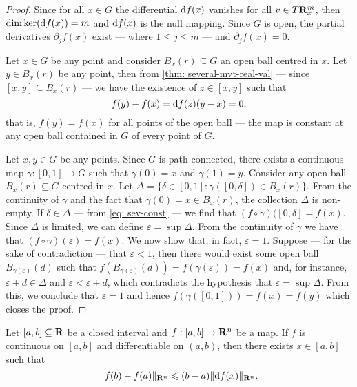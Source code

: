 \begin{proof}
  Since for all \(x \in G\) the differential \(\mathrm{d} f(x)\) vanishes for all \(v
  \in T\mathbf{R}^m_x\), then \(\dim \ker(\mathrm{d} f(x)) = m\) and \(\mathrm{d} f(x)\) is the
  null mapping. Since \(G\) is open, the partial derivatives \(\partial_j f(x)\)
  exist --- where \(1 \leq j \leq m\) --- and \(\partial_j f(x) = 0\).

  Let \(x \in G\) be any point and consider \(B_x(r) \subseteq G\) an open ball
  centred in \(x\). Let \(y \in B_x(r)\) be any point, then from \cref{thm:
  several-mvt-real-val} --- since \([x, y] \subseteq B_x(r)\) --- we have the
  existence of \(z \in [x, y]\) such that
  \begin{equation}\label{eq: sev-const}
    f(y) - f(x) = \mathrm{d} f(z)(y - x) = 0,
  \end{equation}
  that is, \(f(y) = f(x)\) for all points of the open ball --- the map is
  constant at any open ball contained in \(G\) of every point of \(G\).

  Let \(x, y \in G\) be any points. Since \(G\) is path-connected, there exists
  a continuous map \(\gamma: [0, 1] \to G\) such that \(\gamma(0) = x\) and
  \(\gamma(1) = y\). Consider any open ball \(B_x(r) \subseteq G\) centred in
  \(x\). Let \(\Delta = \{\delta \in [0, 1] \colon \gamma([0, \delta]) \in
  B_x(r)\}\). From the continuity of \(\gamma\) and the fact that \(\gamma(0) =
  x \in B_x(r)\), the collection \(\Delta\) is non-empty. If \(\delta \in
  \Delta\) --- from \cref{eq: sev-const} --- we find that \((f \circ \gamma)([0,
  \delta] = f(x)\). Since \(\Delta\) is limited, we can define \(\varepsilon =
  \sup \Delta\). From the continuity of \(\gamma\) we have that \((f \circ
  \gamma)(\varepsilon) = f(x)\). We now show that, in fact, \(\varepsilon = 1\).
  Suppose --- for the sake of contradiction --- that \(\varepsilon < 1\), then
  there would exist some open ball \(B_{\gamma(\varepsilon)}(d)\) such that
  \(f(B_{\gamma(\varepsilon)}(d)) = f(\gamma(\varepsilon)) = f(x)\) and, for
  instance, \(\varepsilon + d \in \Delta\) and \(\varepsilon < \varepsilon +
  d\), which contradicts the hypothesis that \(\varepsilon = \sup \Delta\). From
  this, we conclude that \(\varepsilon = 1\) and hence \(f(\gamma([0, 1])) = f(x)
  = f(y)\) which closes the proof.
\end{proof}

\begin{lemma}\label{lem: mvt-sev-real-dom}
  Let \([a, b] \subseteq \mathbf{R}\) be a closed interval and \(f: [a, b] \to \mathbf{R}^n\) be
  a map. If \(f\) is continuous on \([a, b]\) and differentiable on \((a, b)\),
  then there exists \(x \in [a, b]\) such that
  \[
    \lVert f(b) - f(a)\rVert_{\mathbf{R}^n} \leqslant (b - a) \lVert\mathrm{d} f(x)\rVert_{\mathbf{R}^n}.
  \]
\end{lemma}

